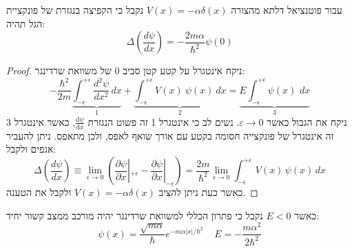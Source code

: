 \documentclass{tstextbook}
\begin{document}
\begin{proposition}
עבור פוטנציאל דלתא מהצורה \(V(x)=-\alpha \delta(x)\) נקבל כי הקפיצה בנגזרת של פונקציית הגל תהיה:
$$\Delta\left(\frac{d\psi}{d x}\right)=-\frac{2m\alpha}{\hbar^{2}}\psi\left(0\right)$$

\end{proposition}
\begin{proof}
ניקח אינטגרל על קטע קטן סביב 0 של משוואת שרדינגר:
$$-\frac{\hbar^{2}}{2m}\underbrace{ \int_{-\epsilon}^{+\epsilon}\frac{d^{2}\psi}{d x^{2}}\,d x }_{ 1 }+\underbrace{ \int_{-\epsilon}^{+\epsilon}V(x)\:\psi(x)\:d x }_{ 2 }=\underbrace{ { E}\int_{-\epsilon}^{+\epsilon}\psi(x)\,\,d x }_{ 3 }$$
ניקח את הגבול כאשר \(\varepsilon\to 0\). נשים לב כי אינטגרל 1 זה פשוט הנגזרת \(\frac{\mathrm{d} \psi}{\mathrm{d} x}\), כאשר אינטגרל 3 זה אינטגרל של פונקצייה חסומה בקטע עם אורך שואף לאפס, ולכן מתאפס. ניתן להעביר אגפים ולקבל:
$$\Delta\left({\frac{d\psi}{d x}}\right)\equiv\operatorname*{lim}_{\epsilon\to0}\left({\frac{\partial\psi}{\partial x}}\left|_{+\epsilon}-{\frac{\partial\psi}{\partial x}}\right|_{-\epsilon}\right)={\frac{2m}{\hbar^{2}}}\operatorname*{lim}_{\epsilon\to0}\int_{-\epsilon}^{+\epsilon}\,V(x)\,\psi(x)\,d x$$
כאשר כעת ניתן להציב \(V(x)=-\alpha \delta(x)\) ולקבל את הטענה.

\end{proof}
\begin{proposition}
כאשר \(E<0\) נקבל כי פתרון הכללי למשוואת שרדינגר יהיה מורכב ממצב קשור יחיד:
$$\psi(x)=\frac{\sqrt{m\alpha}}{\hbar}e^{-m\alpha|x|/\hbar^{2}}\;\;\;\;E=-\frac{m\alpha^{2}}{2\hbar^{2}}$$

\end{proposition}
\end{document}
